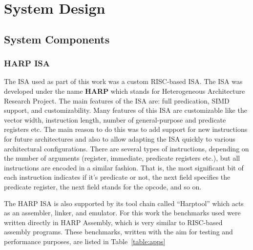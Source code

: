 \setcounter{equation}{0}

\chapter{System Design}
\label{chap: System Design}

\section{System Components}
\subsection{HARP ISA}
The ISA used as part of this work was a custom RISC-based ISA. The ISA was developed under the name \textbf{HARP} which stands for Heterogeneous Architecture Research Project. %
The main features of the ISA are: full predication, SIMD support, and customizability. Many features of this ISA are customizable like the vector width, instruction length, number of general-purpose and predicate registers etc. The main reason to do this was to add support for new instructions for future architectures and also to allow adapting the ISA quickly to various architectural configurations. There are several types of instructions, depending on the number of arguments (register, immediate, predicate registers etc.), but all instructions are encoded in a similar fashion. That is, the most significant bit of each instruction indicates if it's predicate or not, the next field specifies the predicate register, the next field stands for the opcode, and so on. 

The HARP ISA is also supported by its tool chain called ``Harptool'' which acts as an assembler, linker, and emulator. For this work the benchmarks used were written directly in HARP Assembly, which is very similar to RISC-based assembly programs. These benchmarks, written with the aim for testing and performance purposes, are listed in Table~\ref{table:apps}

%

